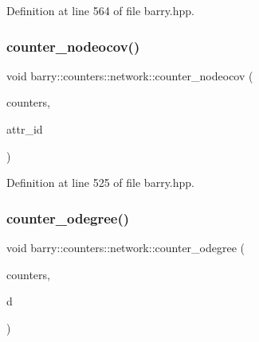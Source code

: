 Definition at line 564 of file barry.\+hpp.

\mbox{\label{namespacebarry_1_1counters_1_1network_a61b287d49772a5bfa3d11d42f70ec1d8}} 
\subsubsection{\texorpdfstring{counter\+\_\+nodeocov()}{counter\_nodeocov()}}
{\footnotesize\ttfamily void barry\+::counters\+::network\+::counter\+\_\+nodeocov (\begin{DoxyParamCaption}\item[{\hyperlink{namespacebarry_1_1counters_1_1network_aa72fdb34752ac24167a06ee196a8fff6}{Net\+Counters} $\ast$}]{counters,  }\item[{\hyperlink{namespacebarry_a11dfc53ddb4672278319aa04f1e09a6c}{uint}}]{attr\+\_\+id }\end{DoxyParamCaption})\hspace{0.3cm}{\ttfamily [inline]}}



Definition at line 525 of file barry.\+hpp.

\mbox{\label{namespacebarry_1_1counters_1_1network_adb3a690ba6de839767b66f8bda088e2e}} 
\subsubsection{\texorpdfstring{counter\+\_\+odegree()}{counter\_odegree()}}
{\footnotesize\ttfamily void barry\+::counters\+::network\+::counter\+\_\+odegree (\begin{DoxyParamCaption}\item[{\hyperlink{namespacebarry_1_1counters_1_1network_aa72fdb34752ac24167a06ee196a8fff6}{Net\+Counters} $\ast$}]{counters,  }\item[{std\+::vector$<$ \hyperlink{namespacebarry_a11dfc53ddb4672278319aa04f1e09a6c}{uint} $>$}]{d }\end{DoxyParamCaption})\hspace{0.3cm}{\ttfamily [inline]}}



